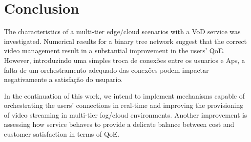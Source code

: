 \section{Conclusion}
\label{sec:conclusion}


The characteristics of a multi-tier edge/cloud scenarios with a VoD service was investigated. Numerical results for a binary tree network suggest that the correct video management result in a substantial improvement in the users' QoE. However, introduzindo uma simples troca de conexões entre os usuarios e Aps, a falta de um orchestramento adequado das conexões podem impactar negativamente a satisfação do usupario.

In the continuation of this work, we intend to implement mechanisms capable of orchestrating the users' connections in real-time and improving the provisioning of video streaming in multi-tier fog/cloud environments.
Another improvement is assessing how service behaves to provide a delicate balance between cost and customer satisfaction in terms of QoE.

